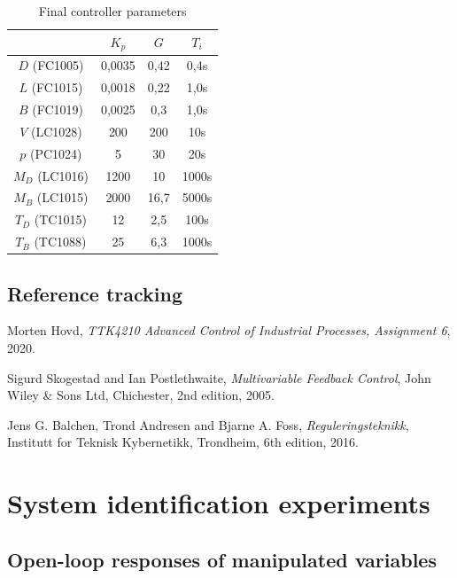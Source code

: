 \documentclass[12pt]{article}
\begin{document}
\begin{table}
\centering
\begin{tabular}{c | c | c | c }
& $K_p$ & $G$ & $T_i$ \\ \hline
$D$ (FC1005) & 0,0035 & 0,42& 0,4s\\
$L$ (FC1015) & 0,0018 & 0,22 & 1,0s \\
$B$ (FC1019) & 0,0025 & 0,3 & 1,0s \\
$V$ (LC1028) & 200 & 200 & 10s \\
$p$ (PC1024) & 5 & 30 & 20s \\
$M_D$ (LC1016) & 1200 & 10 & 1000s \\
$M_B$ (LC1015) & 2000 & 16,7 & 5000s \\
$T_D$ (TC1015) & 12 & 2,5 & 100s \\
$T_B$ (TC1088) & 25 & 6,3 & 1000s
\end{tabular}
\caption{Final controller parameters}
\label{tab:final_controller_parameters}
\end{table}

\subsection{Reference tracking}

\newpage
\begin{thebibliography}{9}

  Morten Hovd,
  \textit{TTK4210 Advanced Control of Industrial Processes, Assignment 6},
  2020.

  Sigurd Skogestad and Ian Postlethwaite,
  \textit{Multivariable Feedback Control},
  John Wiley \& Sons Ltd, Chichester,
  2nd edition,
  2005.
  
  Jens G. Balchen, Trond Andresen and Bjarne A. Foss,
  \textit{Reguleringsteknikk},
  Institutt for Teknisk Kybernetikk, Trondheim,
  6th edition,
  2016.

\end{thebibliography}

\newpage
\appendix
\section{System identification experiments}
\subsection{Open-loop responses of manipulated variables}
\end{document}
